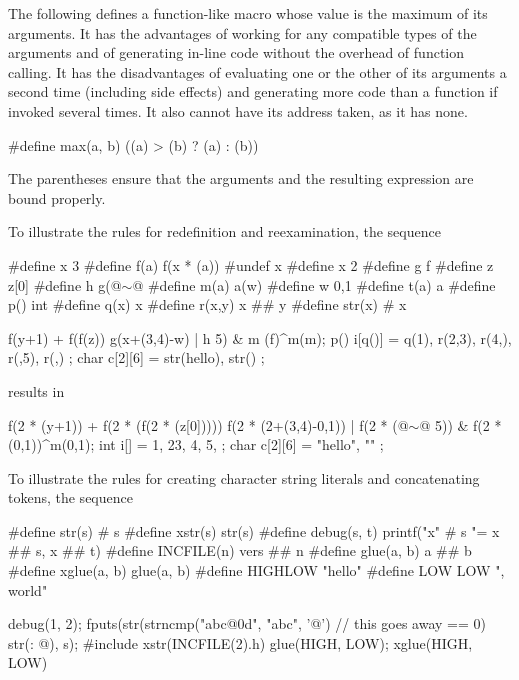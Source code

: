\pnum
\enterexample
The following defines a function-like
macro whose value is the maximum of its arguments.
It has the advantages of working for any compatible types of the arguments
and of generating in-line code without the overhead of function calling.
It has the disadvantages of evaluating one or the other of its arguments
a second time
(including
%
side effects)
and generating more code than a function if invoked several times.
It also cannot have its address taken,
as it has none.

\begin{codeblock}
#define max(a, b) ((a) > (b) ? (a) : (b))
\end{codeblock}

The parentheses ensure that the arguments and
the resulting expression are bound properly.
\exitexample

\pnum
\enterexample
To illustrate the rules for redefinition and reexamination,
the sequence

\begin{codeblock}
#define x       3
#define f(a)    f(x * (a))
#undef  x
#define x       2
#define g       f
#define z       z[0]
#define h       g(@$\sim$@
#define m(a)    a(w)
#define w       0,1
#define t(a)    a
#define p()     int
#define q(x)    x
#define r(x,y)  x ## y
#define str(x)  # x

f(y+1) + f(f(z)) %
g(x+(3,4)-w) | h 5) & m
    (f)^m(m);
p() i[q()] = { q(1), r(2,3), r(4,), r(,5), r(,) };
char c[2][6] = { str(hello), str() };
\end{codeblock}

results in

\begin{codeblock}
f(2 * (y+1)) + f(2 * (f(2 * (z[0])))) %
f(2 * (2+(3,4)-0,1)) | f(2 * (@$\sim$@ 5)) & f(2 * (0,1))^m(0,1);
int i[] = { 1, 23, 4, 5, };
char c[2][6] = { "hello", "" };
\end{codeblock}
\exitexample

\pnum
\enterexample
To illustrate the rules for creating character string literals
and concatenating tokens,
the sequence

\begin{codeblock}
#define str(s)      # s
#define xstr(s)     str(s)
#define debug(s, t) printf("x" # s "= %
               x ## s, x ## t)
#define INCFILE(n)  vers ## n
#define glue(a, b)  a ## b
#define xglue(a, b) glue(a, b)
#define HIGHLOW     "hello"
#define LOW         LOW ", world"

debug(1, 2);
fputs(str(strncmp("abc@\textbackslash@0d", "abc", '@')  // this goes away
    == 0) str(: @\atsign\textbackslash@n), s);
#include xstr(INCFILE(2).h)
glue(HIGH, LOW);
xglue(HIGH, LOW)
\end{codeblock}

